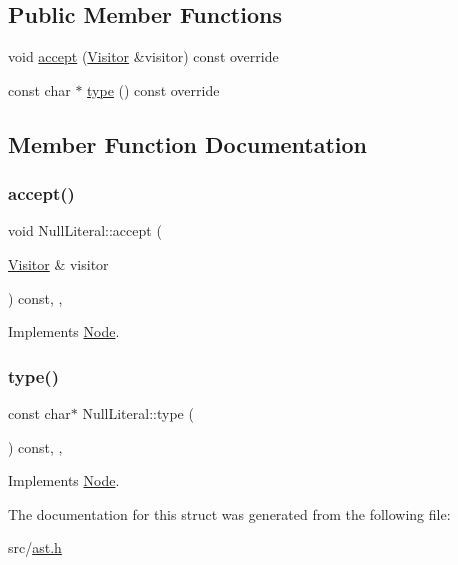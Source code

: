 \subsection*{Public Member Functions}
\begin{DoxyCompactItemize}
\item 
void \hyperlink{struct_null_literal_a988e617d768c43d45b330dc8ed245b72}{accept} (\hyperlink{struct_visitor}{Visitor} \&visitor) const override
\item 
const char $\ast$ \hyperlink{struct_null_literal_a7c74fd0c55589607d0d83782650ad7cc}{type} () const override
\end{DoxyCompactItemize}


\subsection{Member Function Documentation}
\mbox{\label{struct_null_literal_a988e617d768c43d45b330dc8ed245b72}} 
\subsubsection{\texorpdfstring{accept()}{accept()}}
{\footnotesize\ttfamily void Null\+Literal\+::accept (\begin{DoxyParamCaption}\item[{\hyperlink{struct_visitor}{Visitor} \&}]{visitor }\end{DoxyParamCaption}) const\hspace{0.3cm}{\ttfamily [inline]}, {\ttfamily [override]}, {\ttfamily [virtual]}}



Implements \hyperlink{struct_node_a10bd7af968140bbf5fa461298a969c71}{Node}.

\mbox{\label{struct_null_literal_a7c74fd0c55589607d0d83782650ad7cc}} 
\subsubsection{\texorpdfstring{type()}{type()}}
{\footnotesize\ttfamily const char$\ast$ Null\+Literal\+::type (\begin{DoxyParamCaption}{ }\end{DoxyParamCaption}) const\hspace{0.3cm}{\ttfamily [inline]}, {\ttfamily [override]}, {\ttfamily [virtual]}}



Implements \hyperlink{struct_node_a82f29420d0a38efcc370352528e94e9b}{Node}.



The documentation for this struct was generated from the following file\+:\begin{DoxyCompactItemize}
\item 
src/\hyperlink{ast_8h}{ast.\+h}\end{DoxyCompactItemize}
